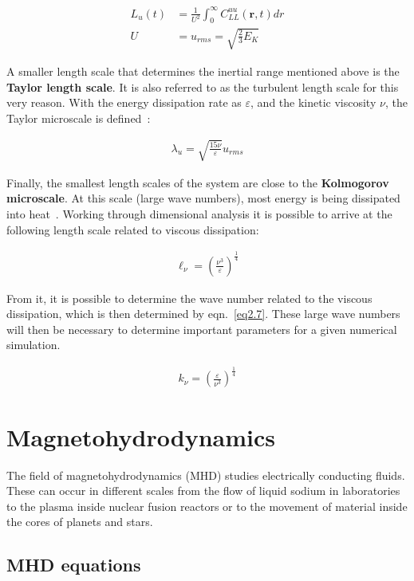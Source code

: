 \documentclass[12pt,a4paper]{report}
\begin{document}
\begin{align}
 L_u(t) &= \frac{1}{U^2} \int_0^\infty C_{LL}^{uu}(\bm r, t) dr \nonumber \\
 U&=u_{rms}=\sqrt{\frac{2}{3}E_K} \nonumber
\end{align}

A smaller length scale that determines the inertial range mentioned above is the \textbf{Taylor length scale}. It is also referred to as the turbulent length scale for this very reason. With the energy dissipation rate as $\varepsilon$, and the kinetic viscosity $\nu$, the Taylor microscale is defined~\cite{LinkmannMoritzFrederikLeon2016Spim}:

\begin{align}
 \lambda_u = \sqrt{\frac{15 \nu}{\varepsilon}} u_{rms} \nonumber
\end{align}

Finally, the smallest length scales of the system are close to the \textbf{Kolmogorov microscale}. At this scale (large wave numbers), most energy is being dissipated into heat~\cite{mccomb1990physics}. Working through dimensional analysis it is possible to arrive at the following length scale related to viscous dissipation:

\begin{align}
 \ell_\nu = \left( \frac{\nu^3}{\varepsilon} \right)^{\frac{1}{4}} \nonumber
\end{align}

From it, it is possible to determine the wave number related to the viscous dissipation, which is then determined by eqn.~\ref{eq2.7}. These large wave numbers will then be necessary to determine important parameters for a given numerical simulation. 

\begin{align}
 k_\nu = \left( \frac{\varepsilon}{\nu^3} \right)^{\frac{1}{4}} \label{eq2.7}
\end{align}

\chapter{Magnetohydrodynamics}

The field of magnetohydrodynamics (MHD) studies electrically conducting fluids. These can occur in different scales from the flow of liquid sodium in laboratories to the plasma inside nuclear fusion reactors or to the movement of material inside the cores of planets and stars. 

\section{MHD equations}
\end{document}
